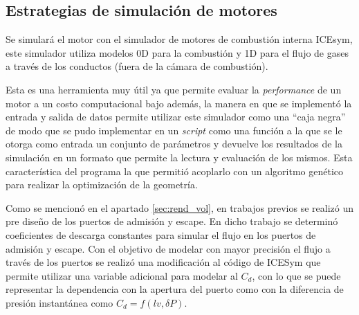 



\subsection{Estrategias de simulación de motores}
%
Se simulará el motor con el simulador de motores de combustión interna ICEsym,
este simulador utiliza modelos 0D para la combustión y 1D para el flujo de
gases a través de los conductos (fuera de la cámara de combustión).

Esta es una herramienta muy útil ya que permite evaluar la \emph{performance} de
un motor a un costo computacional bajo además, la manera en que se implementó la
entrada y salida de datos permite utilizar este simulador como una ``caja
negra'' de modo que se pudo implementar en un \emph{script} como una función a
la que se le otorga como entrada un conjunto de parámetros y devuelve los
resultados de la simulación en un formato que permite la lectura y evaluación de
los mismos.
%
Esta característica del programa la que permitió acoplarlo con un algoritmo
genético para realizar la optimización de la geometría.


Como se mencionó en el apartado \ref{sec:rend_vol}, en trabajos previos se
realizó un pre diseño de los puertos de admisión y escape.
%
En dicho trabajo se determinó coeficientes de descarga constantes
para simular el flujo en los puertos de admisión y escape.
%
Con el objetivo de modelar con mayor precisión el flujo a través de los puertos
se realizó una modificación al código de ICESym que permite utilizar una
variable adicional para modelar al $C_d$, con lo que se puede representar la
dependencia con la apertura del puerto como con la diferencia de presión
instantánea como $C_d = f(lv, \delta P)$.
